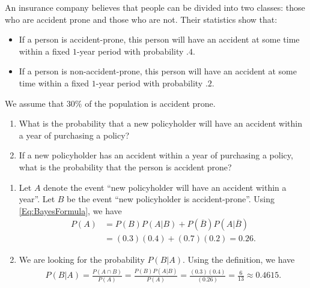 \begin{example}
An insurance company believes that people can be divided into two classes: those who are accident prone and those who are not. Their statistics show that:
	\begin{itemize}
	\item If a person is accident-prone, this person will have an accident at some time within a fixed $1$-year period with probability $.4$.
	\item If a person is non-accident-prone, this person will have an accident at some time within a fixed $1$-year period with probability $.2$.
	\end{itemize}
We assume that $30\%$ of the population is accident prone.
	\begin{enumerate}[label=\alph*)]
	\item What is the probability that a new policyholder will have an accident within a year of purchasing a policy?
	\item If a new policyholder has an accident within a year of purchasing a policy, what is the probability that the person is accident prone?
	\end{enumerate}
\end{example}
 
\begin{sol*}
\begin{enumerate}[label=\alph*)]
\item Let $A$ denote the event ``new policyholder will have an accident within a year''. Let $B$ be the event ``new policyholder is accident-prone''. Using \eqref{Eq:BayesFormula}, we have
	\begin{align*}
	P (A) &= P (B) P (A|B) + P (\overline{B}) P (A | \overline{B}) \\
	&= (0.3)(0.4) + (0.7)(0.2) = 0.26 .
	\end{align*}
\item We are looking for the probability $P (B|A)$. Using the definition, we have
	\begin{align*}
	P (B|A) = \frac{P (A \cap B)}{P (A)} = \frac{P (B) P (A|B)}{P (A)} = \frac{(0.3)(0.4)}{(0.26)} = \frac{6}{13} \approx 0.4615 . \tag*{$\triangle$}
	\end{align*}
\end{enumerate}
\end{sol*}


